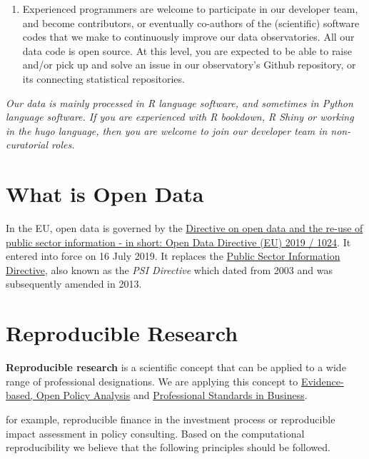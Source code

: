 \documentclass[
  a4paper,
  openany, a4paper, oneside]{book}
\begin{document}
\begin{enumerate}
\item
  Experienced programmers are welcome to participate in our developer team, and become contributors, or eventually co-authors of the (scientific) software codes that we make to continuously improve our data observatories. All our data code is open source. At this level, you are expected to be able to raise and/or pick up and solve an issue in our observatory's Github repository, or its connecting statistical repositories.
\end{enumerate}

\emph{Our data is mainly processed in R language software, and sometimes in Python language software. If you are experienced with R bookdown, R Shiny or working in the hugo language, then you are welcome to join our developer team in non-curatorial roles.}

\hypertarget{open-data}{%
\section{What is Open Data}\label{open-data}}

In the EU, open data is governed by the \href{https://eur-lex.europa.eu/legal-content/EN/TXT/?qid=1561563110433\&uri=CELEX:32019L1024}{Directive on open data and the re-use of public sector information - in short: Open Data Directive (EU) 2019 / 1024}. It entered into force on 16 July 2019. It replaces the \href{https://eur-lex.europa.eu/legal-content/en/ALL/?uri=CELEX:32003L0098}{Public Sector Information Directive}, also known as the \emph{PSI Directive} which dated from 2003 and was subsequently amended in 2013.

\hypertarget{reproducible-research}{%
\section{Reproducible Research}\label{reproducible-research}}

\textbf{Reproducible research} is a scientific concept that can be applied to a wide range of professional designations. We are applying this concept to \protect\hyperlink{opa}{Evidence-based, Open Policy Analysis} and \protect\hyperlink{business-professional-standards}{Professional Standards in Business}.

for example, reproducible finance in the investment process or reproducible impact assessment in policy consulting. Based on the computational reproducibility we believe that the following principles should be followed.
\end{document}
